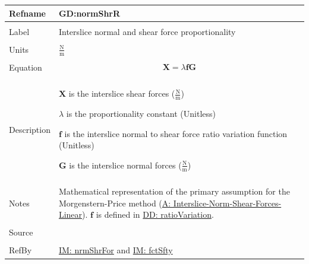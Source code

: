 \documentclass[12pt]{article}
\begin{document}
\vspace{\baselineskip}
\noindent
\begin{minipage}{\textwidth}
\begin{tabular}{>{\raggedright}p{}>{\raggedright\arraybackslash}p{}}
\toprule \textbf{Refname} & \textbf{GD:normShrR}
\label{GD:normShrR}
\\ \midrule \\
Label & Interslice normal and shear force proportionality
        
\\ \midrule \\
Units & $\frac{\text{N}}{\text{m}}$
        
\\ \midrule \\
Equation & \begin{displaymath}
           \mathbf{X}=λ \mathbf{f} \mathbf{G}
           \end{displaymath}
\\ \midrule \\
Description & \begin{symbDescription}
              \item{$\mathbf{X}$ is the interslice shear forces ($\frac{\text{N}}{\text{m}}$)}
              \item{$λ$ is the proportionality constant (Unitless)}
              \item{$\mathbf{f}$ is the interslice normal to shear force ratio variation function (Unitless)}
              \item{$\mathbf{G}$ is the interslice normal forces ($\frac{\text{N}}{\text{m}}$)}
              \end{symbDescription}
\\ \midrule \\
Notes & Mathematical representation of the primary assumption for the Morgenstern-Price method (\hyperref[assumpINSFL]{A: Interslice-Norm-Shear-Forces-Linear}). $\mathbf{f}$ is defined in \hyperref[DD:ratioVariation]{DD: ratioVariation}.
        
\\ \midrule \\
Source & \cite{chen2005}
         
\\ \midrule \\
RefBy & \hyperref[IM:nrmShrFor]{IM: nrmShrFor} and \hyperref[IM:fctSfty]{IM: fctSfty}
        
\\ \bottomrule
\end{tabular}
\end{minipage}
\end{document}
